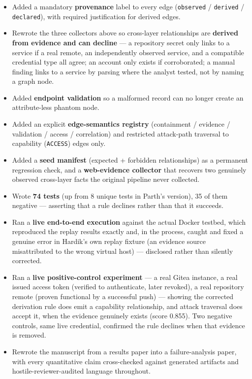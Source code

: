 \documentclass[11pt,a4paper]{article}
\begin{document}
\begin{itemize}[leftmargin=*]
\item Added a mandatory \textbf{provenance} label to every edge (\texttt{observed} / \texttt{derived} / \texttt{declared}), with required justification for derived edges.
\item Rewrote the three collectors above so cross-layer relationships are \textbf{derived from evidence and can decline} --- a repository secret only links to a service if a real remote, an independently observed service, and a compatible credential type all agree; an account only exists if corroborated; a manual finding links to a service by parsing where the analyst tested, not by naming a graph node.
\item Added \textbf{endpoint validation} so a malformed record can no longer create an attribute-less phantom node.
\item Added an explicit \textbf{edge-semantics registry} (containment / evidence / validation / access / correlation) and restricted attack-path traversal to capability (\texttt{ACCESS}) edges only.
\item Added a \textbf{seed manifest} (expected + forbidden relationships) as a permanent regression check, and a \textbf{web-evidence collector} that recovers two genuinely observed cross-layer facts the original pipeline never collected.
\item Wrote \textbf{74 tests} (up from 8 unique tests in Parth's version), 35 of them negative --- asserting that a rule declines rather than that it succeeds.
\item Ran a \textbf{live end-to-end execution} against the actual Docker testbed, which reproduced the replay results exactly and, in the process, caught and fixed a genuine error in Hardik's own replay fixture (an evidence source misattributed to the wrong virtual host) --- disclosed rather than silently corrected.
\item Ran a \textbf{live positive-control experiment} --- a real Gitea instance, a real issued access token (verified to authenticate, later revoked), a real repository remote (proven functional by a successful push) --- showing the corrected derivation rule does emit a capability relationship, and attack traversal does accept it, when the evidence genuinely exists (score 0.855). Two negative controls, same live credential, confirmed the rule declines when that evidence is removed.
\item Rewrote the manuscript from a results paper into a failure-analysis paper, with every quantitative claim cross-checked against generated artifacts and hostile-reviewer-audited language throughout.
\end{itemize}
\end{document}

